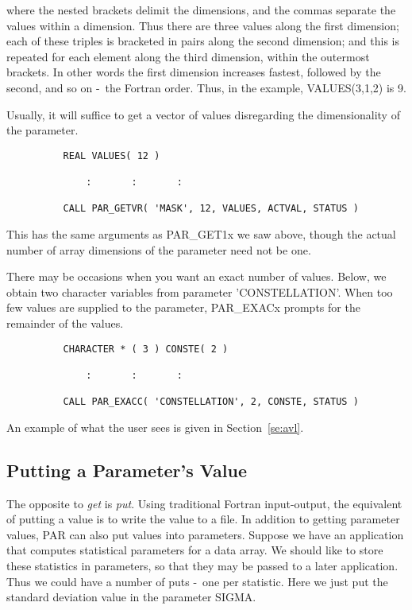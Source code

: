 \documentclass[twoside,11pt]{article}
\newcommand{\xlabel}[1]{}
\newcommand{\dash}{--}
\renewcommand{\dash}{-}
\begin{document}
where the nested brackets delimit the dimensions, and the commas
separate the values within a dimension.  Thus there are three values
along the first dimension; each of these triples is bracketed in pairs
along the second dimension; and this is repeated for each element along
the third dimension, within the outermost brackets.  In other words the
first dimension increases fastest, followed by the second, and so
on \dash\ the Fortran order.  Thus, in the example, VALUES(3,1,2) is 9. 

Usually, it will suffice to get a vector of values disregarding
the dimensionality of the parameter.

\begin{verbatim}
          REAL VALUES( 12 )

              :       :       :

          CALL PAR_GETVR( 'MASK', 12, VALUES, ACTVAL, STATUS )
\end{verbatim}

This has the same arguments as PAR\_GET1x we saw above, though the actual
number of array dimensions of the parameter need not be one.

There may be occasions when you want an exact number of values. 
Below, we obtain two character variables from parameter 'CONSTELLATION'.
When too few values are supplied to the parameter, PAR\_EXACx
prompts for the remainder of the values.

\begin{verbatim}
          CHARACTER * ( 3 ) CONSTE( 2 )

              :       :       :

          CALL PAR_EXACC( 'CONSTELLATION', 2, CONSTE, STATUS )
\end{verbatim}

An example of what the user sees is given in Section~\ref{se:avl}.

\subsection{\xlabel{putting_a_parameters_value}Putting a Parameter's Value}

The opposite to {\em get\/} is {\em put}.  Using traditional Fortran
input-output, the equivalent of putting a value is to write the value to
a file.  In addition to getting parameter values, PAR can also put
values into parameters.  Suppose we have an application that computes
statistical parameters for a data array.  We should like to store these
statistics in parameters, so that they may be passed to a later
application.  Thus we could have a number of puts \dash\ one per statistic.
Here we just put the standard deviation value in the parameter SIGMA. 
\end{document}
